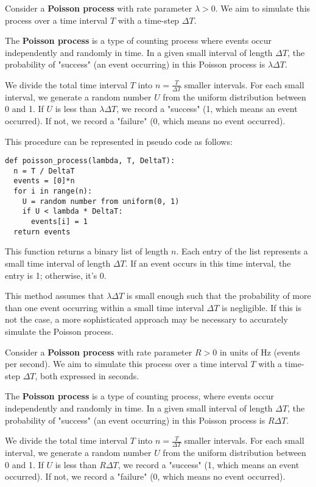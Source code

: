 Consider a \textbf{Poisson process} with rate parameter $\lambda > 0$. We aim to simulate this process over a time interval $T$ with a time-step $\Delta T$.

The \textbf{Poisson process} is a type of counting process where events occur independently and randomly in time. In a given small interval of length $\Delta T$, the probability of "success" (an event occurring) in this Poisson process is $\lambda \Delta T$. 

We divide the total time interval $T$ into $n = \frac{T}{\Delta T}$ smaller intervals. For each small interval, we generate a random number $U$ from the uniform distribution between 0 and 1. If $U$ is less than $\lambda \Delta T$, we record a "success" (1, which means an event occurred). If not, we record a "failure" (0, which means no event occurred).

This procedure can be represented in pseudo code as follows:

\begin{verbatim}
def poisson_process(lambda, T, DeltaT):
  n = T / DeltaT
  events = [0]*n
  for i in range(n):
    U = random number from uniform(0, 1)
    if U < lambda * DeltaT:
      events[i] = 1
  return events
\end{verbatim}

This function returns a binary list of length $n$. Each entry of the list represents a small time interval of length $\Delta T$. If an event occurs in this time interval, the entry is 1; otherwise, it's 0. 

This method assumes that $\lambda \Delta T$ is small enough such that the probability of more than one event occurring within a small time interval $\Delta T$ is negligible. If this is not the case, a more sophisticated approach may be necessary to accurately simulate the Poisson process.


Consider a \textbf{Poisson process} with rate parameter $R > 0$ in units of Hz (events per second). We aim to simulate this process over a time interval $T$ with a time-step $\Delta T$, both expressed in seconds.

The \textbf{Poisson process} is a type of counting process, where events occur independently and randomly in time. In a given small interval of length $\Delta T$, the probability of "success" (an event occurring) in this Poisson process is $R \Delta T$.

We divide the total time interval $T$ into $n = \frac{T}{\Delta T}$ smaller intervals. For each small interval, we generate a random number $U$ from the uniform distribution between 0 and 1. If $U$ is less than $R \Delta T$, we record a "success" (1, which means an event occurred). If not, we record a "failure" (0, which means no event occurred).

